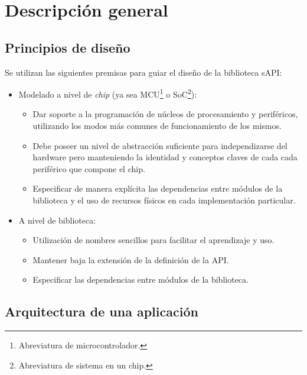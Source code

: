 \section{Descripción general}
\label{sec:designDescipGral}

\subsection{Principios de diseño}

Se utilizan las siguientes premisas para guiar el diseño de la biblioteca sAPI:

\begin{itemize}
\item
Modelado a nivel de \emph{chip} (ya sea MCU\footnote{Abreviatura de microcontrolador.} o SoC\footnote{Abreviatura de sistema en un chip.}):
\begin{itemize}
\item
Dar soporte a la programación de núcleos de procesamiento y periféricos, utilizando los modos más comunes de funcionamiento de los mismos.
\item
Debe poseer un nivel de abstracción suficiente para independizarse del hardware pero manteniendo la identidad y conceptos claves de cada cada periférico que compone el chip.
\item
Especificar de manera explícita las dependencias entre módulos de la biblioteca y el uso de recursos físicos en cada implementación particular.
\end{itemize}
\item
A nivel de biblioteca:
\begin{itemize}
\item
Utilización de nombres sencillos para facilitar el aprendizaje y uso.
\item
Mantener baja la extensión de la definición de la API.
\item
Especificar las dependencias entre módulos de la biblioteca.
\end{itemize}
\end{itemize}

\subsection{Arquitectura de una aplicación}

